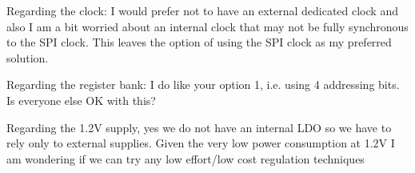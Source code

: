 Regarding the clock:
I would prefer not to have an external dedicated clock and also I am a bit worried about an internal clock that may not be fully synchronous to the SPI clock. This leaves the option of using the SPI clock as my preferred solution. 

Regarding the register bank:
I do like your option 1, i.e. using 4 addressing bits. Is everyone else OK with this?

Regarding the 1.2V supply, yes we do not have an internal LDO so we have to rely only to external supplies. Given the very low power consumption at 1.2V I am wondering if we can try any low effort/low cost regulation techniques

